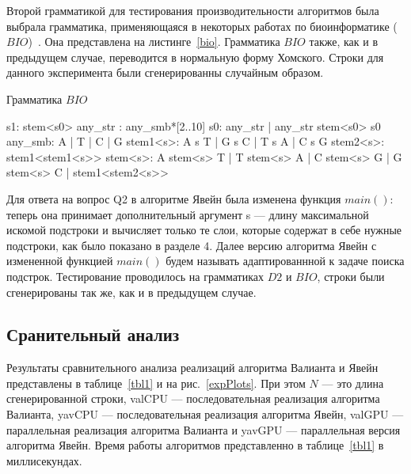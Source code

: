 Второй грамматикой для тестирования производительности алгоритмов была выбрала грамматика, применяющаяся в некоторых работах по биоинформатике ($BIO$)~\cite{bioinformatics19}. Она представлена на листинге~\ref{bio}. Грамматика $BIO$ также, как и в предыдущем случае, переводится в нормальную форму Хомского. Строки для данного эксперимента были сгенерированны случайным образом.

\begin{listing}[h]
\caption{Грамматика $BIO$}
\begin{pyglist}[]
            s1: stem<s0>
            any_str : any_smb*[2..10]
            s0: any_str | any_str stem<s0> s0
            any_smb: A | T | C | G
            stem1<s>: A s T | G s C | T s A | C s G
            stem2<s>: stem1<stem1<s>>
            stem<s>:
                  A stem<s> T
                | T stem<s> A
                | C stem<s> G
                | G stem<s> C
                | stem1<stem2<s>>
\end{pyglist}
\label{bio}
\end{listing}


Для ответа на вопрос Q2 в алгоритме Явейн была изменена функция $main()$: теперь она принимает дополнительный аргумент s --- длину максимальной искомой подстроки и вычисляет только те слои, которые содержат в себе нужные подстроки, как было показано в разделе 4. Далее версию алгоритма Явейн с измененной функцией $main()$ будем называть адаптированнной к задаче поиска подстрок. Тестирование проводилось на грамматиках $D2$ и $BIO$, строки были сгенерированы так же, как и в предыдущем случае.


\subsection{Сранительный анализ}

Результаты сравнительного анализа реализаций алгоритма Валианта и Явейн представлены в таблице~\ref{tbl1} и на рис.~\ref{expPlots}.
При этом $N$ --- это длина сгенерированной строки, valCPU --- последовательная реализация алгоритма Валианта, yavCPU --- последовательная реализация алгоритма Явейн, valGPU --- параллельная реализация алгоритма Валианта и yavGPU --- параллельная версия алгоритма Явейн.
Время работы алгоритмов представленно в таблице~\ref{tbl1}  в миллисекундах.

